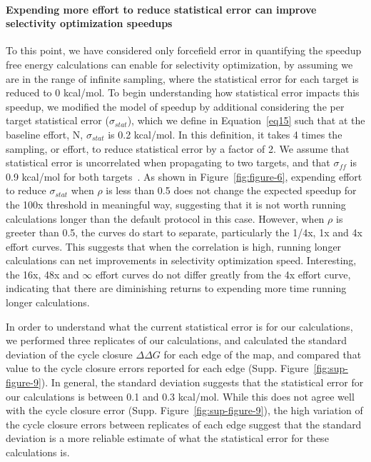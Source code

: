 \documentclass[9pt,lineno]{elife-modified} %
\begin{document}
\paragraph{Expending more effort to reduce statistical error can improve selectivity optimization speedups}
To this point, we have considered only forcefield error in quantifying the speedup free energy calculations can enable for selectivity optimization, by assuming we are in the range of infinite sampling, where the statistical error for each target is reduced to 0 kcal/mol. To begin understanding how statistical error impacts this speedup, we modified the model of speedup by additional considering the per target statistical error ($\sigma_{stat}$), which we define in Equation~\ref{eq15} such that at the baseline effort, N, $\sigma_{stat}$ is 0.2 kcal/mol. In this definition, it takes 4 times the sampling, or effort, to reduce statistical error by a factor of 2. We assume that statistical error is uncorrelated when propagating to two targets, and that $\sigma_{ff}$ is 0.9 kcal/mol for both targets~\citep{Harder2016-zn, Hauser:2018vz}. As shown in Figure~\ref{fig:figure-6}, expending effort to reduce $\sigma_{stat}$ when $\rho$ is less than 0.5 does not change the expected speedup for the 100x threshold in meaningful way, suggesting that it is not worth running calculations longer than the default protocol in this case. However, when $\rho$ is greeter than 0.5, the curves do start to separate, particularly the 1/4x, 1x and 4x effort curves. This suggests that when the correlation is high, running longer calculations can net improvements in selectivity optimization speed. Interesting, the 16x, 48x and $\infty$ effort curves do not differ greatly from the 4x effort curve, indicating that there are diminishing returns to expending more time running longer calculations. 

In order to understand what the current statistical error is for our calculations, we performed three replicates of our calculations, and calculated the standard deviation of the cycle closure $\Delta \Delta G$ for each edge of the map, and compared that value to the cycle closure errors reported for each edge (Supp. Figure~\ref{fig:sup-figure-9}). In general, the standard deviation suggests that the statistical error for our calculations is between 0.1 and 0.3 kcal/mol. While this does not agree well with the cycle closure error (Supp. Figure~\ref{fig:sup-figure-9}), the high variation of the cycle closure errors between replicates of each edge suggest that the standard deviation is a more reliable estimate of what the statistical error for these calculations is. 
\end{document}
